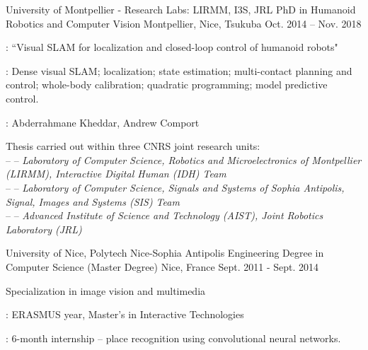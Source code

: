 
\begin{cventries}

  \cventry
  {University of Montpellier - Research Labs: LIRMM, I3S, JRL} %
  {PhD in Humanoid Robotics and Computer Vision} %
  {Montpellier, Nice, Tsukuba} %
  {Oct. 2014 -- Nov. 2018} %
  {
    \begin{cvitems} %
    \item {}: ``Visual SLAM for localization and closed-loop control of humanoid robots"
    \item {}: Dense visual SLAM; localization; state estimation; multi-contact
      planning and control; whole-body calibration; quadratic programming; model predictive control.
    \item {}: Abderrahmane Kheddar, Andrew Comport
    \item Thesis carried out within three CNRS joint research units:\\
      --  -- \emph{Laboratory of Computer Science, Robotics
      and Microelectronics of Montpellier (LIRMM), Interactive Digital Human (IDH) Team}\\
      --  -- \emph{Laboratory of Computer Science, Signals
      and Systems of Sophia Antipolis, Signal, Images and Systems (SIS) Team}\\
      --  -- \emph{Advanced Institute of Science and
      Technology (AIST), Joint Robotics Laboratory (JRL)}
    \end{cvitems}
  }

  \cventry
  {University of Nice, Polytech Nice-Sophia Antipolis} %
  {Engineering Degree in Computer Science (Master Degree)} %
  {Nice, France} %
  {Sept. 2011 - Sept. 2014} %
  {
    \begin{cvitems} %
    \item Specialization in image vision and multimedia
    \item {}: ERASMUS year, Master's in Interactive Technologies
    \item {}: 6-month internship -- place recognition
      using convolutional neural networks.
    \end{cvitems}
  }


\end{cventries}
